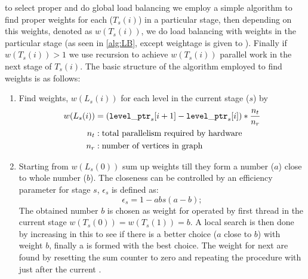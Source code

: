 \Inorder to select proper \subgraph and do global load balancing we employ a simple algorithm to find proper weights for each \levelGroup ($T_s(i)$) in a particular stage, then depending on this weights, denoted as $w(T_s(i))$, we do load balancing with weights in the particular stage (as seen in \cref{alg:LB}, except weightage is given to \levelGroups). Finally if $w(T_s(i)) > 1$ we use recursion to achieve $w(T_s(i))$ parallel work in the next stage of $T_s(i)$. The basic structure of the algorithm employed to find weights is as follows:
\begin{enumerate}
	\item Find weights, $w(L_s(i))$ for each level in the current stage ($s$) by
		\begin{align*}
			w(L_s(i)) &= ({\tt level\_ptr}_s[i+1] - {\tt level\_ptr}_s[i])*\frac{n_{t}}{n_{r}}\\
			n_{t} &: \text{total parallelism required by hardware}\\
			n_{r} &: \text{number of vertices in graph}
		\end{align*}
	
	\item Starting from $w(L_s(0))$ sum up weights till they form a number ($a$) close to whole number ($b$). The closeness can be controlled by an efficiency parameter for stage $s$, $\epsilon_s$ is defined as:
	\begin{equation} \label{eq:epsilon}
		\epsilon_s =  1 - abs(a-b);
	\end{equation}
	The obtained number $b$ is chosen as weight for \levelGroups operated by first thread in the current stage \ie $w(T_s(0))=w(T_s(1))=b$. A local search is then done by increasing \levels in this \levelGroups to see if there is a better choice ($a$ close to $b$) with weight $b$, finally a \levelGroup is formed with the best choice.  The weight for next \levelGroups are found by resetting the sum counter to zero and repeating the  procedure with \levels just after the current \levelGroups.
\end{enumerate}
